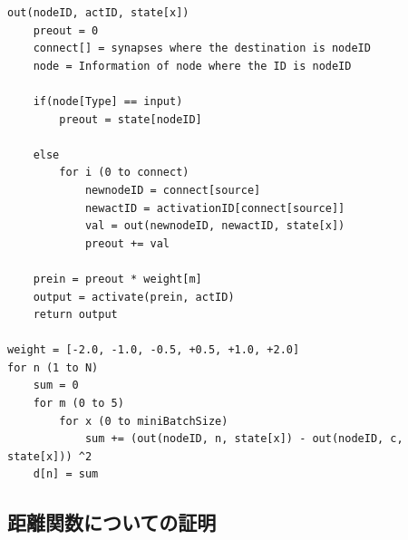 \begin{lstlisting}[経験入力に基づく出力差のプログラム]
out(nodeID, actID, state[x])
    preout = 0
    connect[] = synapses where the destination is nodeID
    node = Information of node where the ID is nodeID

    if(node[Type] == input)
        preout = state[nodeID]
    
    else
        for i (0 to connect)
            newnodeID = connect[source]
            newactID = activationID[connect[source]]
            val = out(newnodeID, newactID, state[x])
            preout += val
    
    prein = preout * weight[m]
    output = activate(prein, actID)
    return output

weight = [-2.0, -1.0, -0.5, +0.5, +1.0, +2.0]
for n (1 to N)
    sum = 0
    for m (0 to 5)
        for x (0 to miniBatchSize)
            sum += (out(nodeID, n, state[x]) - out(nodeID, c, state[x])) ^2
    d[n] = sum
\end{lstlisting}

\subsection{距離関数についての証明}
